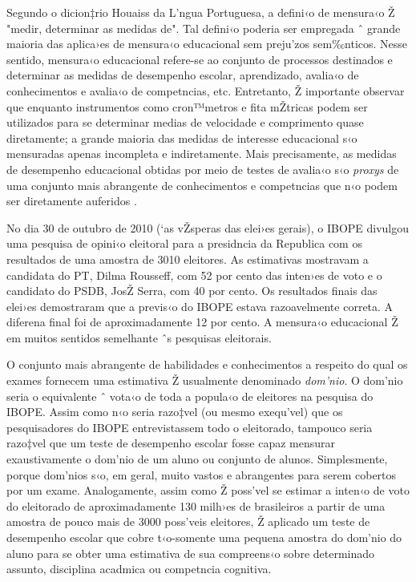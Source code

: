 \documentclass[a4paper, 12pt]{article}
\begin{document}
Segundo o dicion‡rio Houaiss da L’ngua Portuguesa, a defini‹o de mensura‹o Ž "medir, determinar as medidas de".  Tal defini‹o poderia ser empregada ˆ grande maioria das aplica›es de mensura‹o educacional sem preju’zos sem‰nticos. Nesse sentido, mensura‹o educacional refere-se ao conjunto de processos destinados e determinar as medidas de desempenho escolar, aprendizado, avalia‹o de conhecimentos e avalia‹o de competncias, etc. Entretanto, Ž importante observar que enquanto instrumentos como cron™metros e fita mŽtricas podem ser utilizados para se determinar medias de velocidade e comprimento quase diretamente; a grande maioria das medidas de interesse educacional s‹o mensuradas apenas incompleta e indiretamente. Mais precisamente, as medidas de desempenho educacional obtidas por meio de testes de avalia‹o s‹o \emph{proxys} de uma conjunto mais abrangente de conhecimentos e competncias que n‹o podem ser diretamente auferidos \cite{koretz_measuring_2008}. 

No dia 30 de outubro de 2010 (`as vŽsperas das elei›es gerais), o IBOPE divulgou uma pesquisa de opini‹o eleitoral para a presidncia da Republica com os resultados de uma amostra de 3010 eleitores. As estimativas mostravam a candidata do PT, Dilma Rousseff, com 52 por cento das inten›es de voto e o candidato do PSDB, JosŽ Serra, com 40 por cento.  Os resultados finais das elei›es demostraram que a previs‹o do IBOPE estava razoavelmente correta. A diferena final foi de aproximadamente 12 por cento. A mensura‹o educacional Ž em muitos sentidos semelhante ˆs pesquisas eleitorais. 

O conjunto mais abrangente de habilidades e conhecimentos a respeito do qual os exames fornecem uma estimativa Ž usualmente denominado \emph{dom’nio}. O dom’nio seria o equivalente ˆ vota‹o de toda a popula‹o de eleitores na pesquisa do IBOPE. Assim como n‹o seria razo‡vel (ou mesmo exequ’vel) que os pesquisadores do IBOPE entrevistassem todo o eleitorado, tampouco seria razo‡vel que um teste de desempenho escolar fosse capaz mensurar exaustivamente o dom’nio de um aluno ou conjunto de alunos. Simplesmente, porque dom’nios s‹o, em geral, muito vastos e abrangentes para serem cobertos por um exame. Analogamente, assim como Ž poss’vel se estimar a inten‹o de voto do eleitorado de aproximadamente 130 milh›es de brasileiros a partir de uma amostra de pouco mais de 3000 poss’veis eleitores, Ž aplicado um teste de desempenho escolar que cobre t‹o-somente uma pequena amostra do dom’nio do aluno para se obter uma estimativa de sua compreens‹o sobre determinado assunto, disciplina acadmica ou competncia cognitiva.
\end{document}
